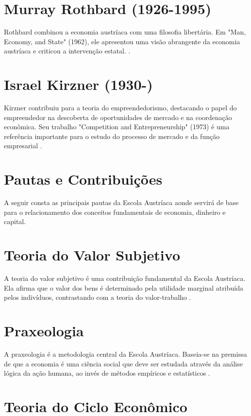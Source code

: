 \section*{Murray Rothbard (1926-1995)} 
Rothbard combinou a economia austríaca com uma filosofia libertária. Em "Man, Economy, and State" (1962), ele apresentou uma visão abrangente da economia austríaca e criticou a intervenção estatal. \cite{rothbard1962man}.

\section*{Israel Kirzner (1930-)} 
Kirzner contribuiu para a teoria do empreendedorismo, destacando o papel do empreendedor na descoberta de oportunidades de mercado e na coordenação econômica. Seu trabalho "Competition and Entrepreneurship" (1973) é uma referência importante para o estudo do processo de mercado e da função empresarial \cite{kirzner1973competition}.

\section*{Pautas e Contribuições}
A seguir consta as principais pautas da Escola Austríaca aonde servirá de base para o relacionamento dos conceitos fundamentais de economia, dinheiro e capital.

\section*{Teoria do Valor Subjetivo}

A teoria do valor subjetivo é uma contribuição fundamental da Escola Austríaca. Ela afirma que o valor dos bens é determinado pela utilidade marginal atribuída pelos indivíduos, contrastando com a teoria do valor-trabalho \cite{menger1871principles}.

\section*{Praxeologia}

A praxeologia é a metodologia central da Escola Austríaca. Baseia-se na premissa de que a economia é uma ciência social que deve ser estudada através da análise lógica da ação humana, ao invés de métodos empíricos e estatísticos \cite{mises1949human}.

\section*{Teoria do Ciclo Econômico}

